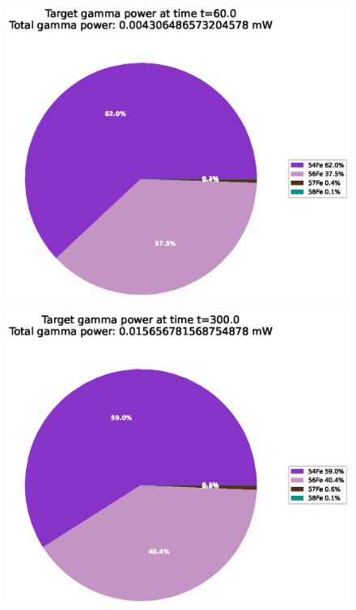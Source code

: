 \begin{figure}[!htb]
\centering
\includegraphics[width=0.8\linewidth]{chapters/activity_code/fe-activity-v2/target-energy/0020_60.eps}
\caption{}
\label{fig:activity-v2-target-power-60s}
\end{figure}

\begin{figure}[!htb]
\centering
\includegraphics[width=0.8\linewidth]{chapters/activity_code/fe-activity-v2/target-energy/0100_300.eps}
\caption{}
\label{fig:activity-v2-target-power-300s}
\end{figure}

